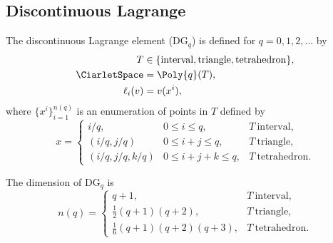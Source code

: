\subsection{Discontinuous Lagrange}

\begin{definition}
  The discontinuous Lagrange element ($\mathrm{DG}_q$)
  is defined for $q = 0, 1, 2, \dots$ by
  \begin{align}
    T &\in \{ \mathrm{interval}{},
              \mathrm{triangle}{},
              \mathrm{tetrahedron}{}\}, \\
    \CiarletSpace &= \Poly{q}(T), \\
    \ell_i(v) &= v(x^i),
  \end{align}
  where $\{ x^i \}_{i=1}^{n(q)}$ is an enumeration of points in
  $T$ defined by
  \begin{equation}
    x =
    \left \{
    \begin{array}{lll}
      i/q,            & 0 \leqslant i \leqslant q,         & T~\mathrm{interval}, \\
      (i/q, j/q)      & 0 \leqslant i + j \leqslant q,     & T~\mathrm{triangle}, \\
      (i/q, j/q, k/q) & 0 \leqslant i + j + k \leqslant q, & T~\mathrm{tetrahedron}.
    \end{array}
    \right.
  \end{equation}
\end{definition}
The dimension of $\mathrm{DG}_q$ is
\begin{equation}
  n(q) =
    \left \{
    \begin{array}{ll}
      q + 1, & T~\mathrm{interval}, \\
      \frac{1}{2} (q + 1)(q + 2), & T~\mathrm{triangle}, \\
      \frac{1}{6} (q + 1)(q + 2)(q + 3), & T~\mathrm{tetrahedron}.
    \end{array}
    \right.
\end{equation}

